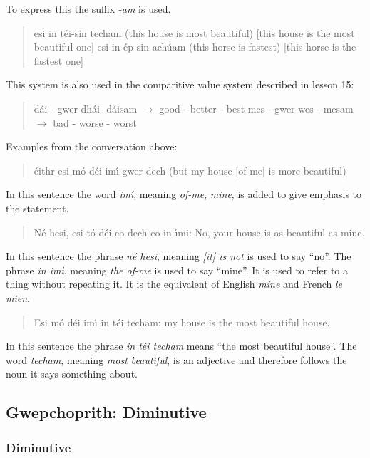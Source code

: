 To express this the suffix \textit{-am} is used.

\begin{quote}
esi in t\'{e}i-sin techam (this house is most beautiful) [this house is the most beautiful one]
esi in \'{e}p-sin ach\'{u}am (this horse is fastest) [this horse is the fastest one]
\end{quote}

This system is also used in the comparitive value system described in lesson 15:

\begin{quote}
d\'{a}i - gwer dh\'{a}i- d\'{a}isam $\rightarrow$ good - better - best
mes - gwer wes - mesam $\rightarrow$ bad - worse - worst
\end{quote}

Examples from the conversation above:

\begin{quote}
\'{e}ithr esi m\'{o} d\'{e}i im\'{\i} gwer dech (but my house [of-me] is more beautiful)
\end{quote}
In this sentence the word \textit{im\'{\i}}, meaning \textit{of-me}, \textit{mine}, is added to give emphasis to the statement.

\begin{quote}
N\'{e} hesi, esi t\'{o} d\'{e}i co dech co in \'{\i}mi: No, your house is as beautiful as mine.
\end{quote}
In this sentence the phrase \textit{n\'{e} hesi}, meaning \textit{[it] is not} is used to say ``no''.
The phrase \textit{in im\'{\i}}, meaning \textit{the of-me} is used to say ``mine''. It is used to refer to a thing without repeating it. It is the equivalent of English \textit{mine} and French \textit{le mien}.

\begin{quote}
Esi m\'{o} d\'{e}i im\'{\i} in t\'{e}i techam: my house is the most beautiful house.
\end{quote}
In this sentence the phrase \textit{in t\'{e}i techam} means ``the most beautiful house''. The word \textit{techam}, meaning \textit{most beautiful}, is an adjective and therefore follows the noun it says something about.

\subsection{Gwepchoprith: Diminutive}
\subsubsection{Diminutive}

